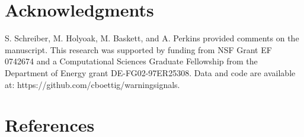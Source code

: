 \documentclass[authoryear,review,11pt]{elsarticle}
\begin{document}
\section{Acknowledgments}
S. Schreiber, M. Holyoak, M. Baskett, and A. Perkins provided comments on the manuscript.  This research was supported by funding from NSF Grant EF 0742674 and a Computational Sciences Graduate Fellowship from the Department of Energy grant DE-FG02-97ER25308. Data and code are available at: https://github.com/cboettig/warningsignals. 




\section{References}%


 
\end{document}

